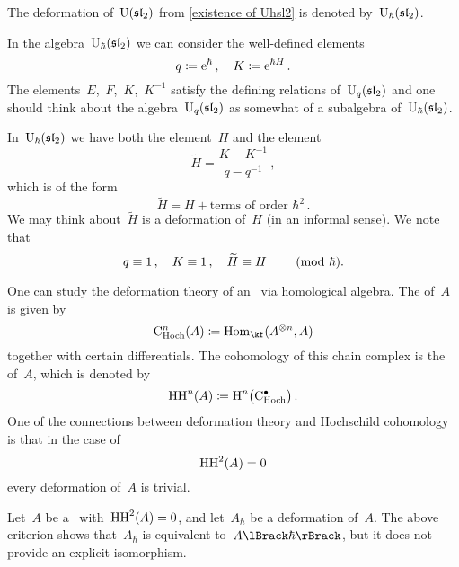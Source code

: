\documentclass[a4paper, 11pt, oneside]{scrartcl}
\begin{document}
\begin{definition}
  The deformation of~$\operatorname{U}(\mathfrak{sl}_2)$ from \cref{existence of Uhsl2} is denoted by~$\operatorname{U}_{\hbar}(\mathfrak{sl}_2)$.
\end{definition}

\begin{remark}
  In the algebra~$\operatorname{U}_{\hbar}(\mathfrak{sl}_2)$ we can consider the well-defined elements
  \[
    q \coloneqq \mathrm{e}^{\hbar} \,,
    \quad
    K \coloneqq \mathrm{e}^{\hbar H} \,.
  \]
  The elements~$E$,~$F$,~$K$,~$K^{-1}$ satisfy the defining relations of~$\operatorname{U}_q(\mathfrak{sl}_2)$ and one should think about the algebra~$\operatorname{U}_q(\mathfrak{sl}_2)$ as somewhat of a subalgebra of~$\operatorname{U}_{\hbar}(\mathfrak{sl}_2)$.

  In~$\operatorname{U}_{\hbar}(\mathfrak{sl}_2)$ we have both the element~$H$ and the element
  \[
    \widetilde{H}
    =
    \frac{K - K^{-1}}{q - q^{-1}} \,,
  \]
  which is of the form
  \[
    \widetilde{H}
    =
    H + \text{terms of order~$\hbar^2$} \,.
  \]
  We may think about~$\widetilde{H}$ is a deformation of~$H$ (in an informal sense).
  We note that
  \[
    q \equiv 1 \,,
    \quad
    K \equiv 1 \,,
    \quad
    \widetilde{H} \equiv H
    \qquad
    \ (\mathrm{mod}\ \hbar).
  \]
\end{remark}

\begin{remark}
  One can study the deformation theory of an~\algebra{$\kf$} via homological algebra.
  The  of~$A$ is given by
  \[
    \CHoch^n(A)
    \defined
    \Hom_{\kf}(A^{\tensor n}, A)
  \]
  together with certain differentials.
  The cohomology of this chain complex is the  of~$A$, which is denoted by
  \[
    \HH^n(A)
    \defined
    \Homology^n\bigl( \CHoch^\bullet \bigr) \,.
  \]
  One of the connections between deformation theory and Hochschild cohomology is that in the case of
  \[
    \operatorname{HH}^2(A) = 0
  \]
  every deformation of~$A$ is trivial.
\end{remark}

\begin{warning}
  Let~$A$ be a~\algebra{$\kf$} with~$\operatorname{HH}^2(A) = 0$, and let~$A_\hbar$ be a deformation of~$A$.
  The above criterion shows that~$A_\hbar$ is equivalent to~$\power{A}{\hbar}$, but it does not provide an explicit isomorphism.
\end{warning}
\end{document}

